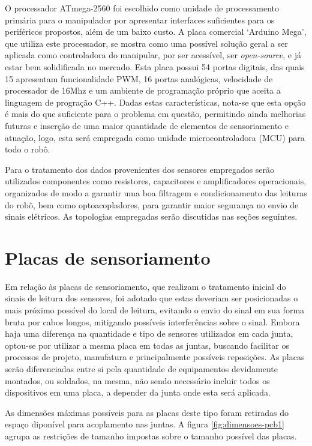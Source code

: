 O processador ATmega-2560 foi escolhido como unidade de processamento 
primária para o manipulador por apresentar interfaces suficientes para 
os periféricos propostos, além de um baixo custo. A placa comercial 
`Arduino Mega', que utiliza este processador, se mostra como uma possível 
solução geral a ser aplicada como controladora do manipular, por ser 
acessível, ser \textit{open-source}, e já estar bem solidificada no mercado. 
Esta placa possui 54 portas digitais, das quais 15 apresentam funcionalidade 
PWM, 16 portas analógicas, velocidade 
de processador de 16Mhz e um ambiente de programação próprio que aceita a 
linguagem de progração C++. Dadas estas características, nota-se que esta 
opção é mais do que suficiente para o problema em questão, permitindo ainda 
melhorias futuras e inserção de uma maior quantidade de elementos de 
sensoriamento e atuação, logo, esta será empregada como unidade microcontroladora
(MCU) para todo o robô.

Para o tratamento dos dados provenientes dos sensores empregados serão 
utilizados componentes como resistores, capacitores e amplificadores 
operacionais, organizados de modo a garantir uma boa filtragem e condicionamento 
das leituras do robô, bem como optoacopladores, para garantir maior segurança no envio
de sinais elétricos.
As topologias empregadas serão discutidas nas seções seguintes.

\section{Placas de sensoriamento}

Em relação às placas de sensoriamento, que realizam o tratamento inicial 
do sinais de leitura dos sensores, foi adotado que estas deveriam 
ser posicionadas o mais próximo possível do local de leitura,
evitando o envio do sinal em sua forma bruta por cabos longos, mitigando
possíveis interferências sobre o sinal. Embora haja uma diferença na quantidade
e tipo de sensores utilizados em cada junta, optou-se por utilizar a mesma
placa em todas as juntas, buscando facilitar os processos de projeto, manufatura
e principalmente possíveis reposições. As placas serão diferenciadas entre si 
pela quantidade de equipamentos devidamente montados, ou soldados, na mesma, não
sendo necessário incluir todos os dispositivos em uma placa, a depender da junta
onde esta será aplicada.

As dimensões máximas possíveis para as placas deste tipo foram retiradas 
do espaço diponível para acoplamento nas juntas. A figura \ref{fig:dimensoes-pcb1} 
agrupa as restrições de tamanho impostas sobre o tamanho possível das placas. 

